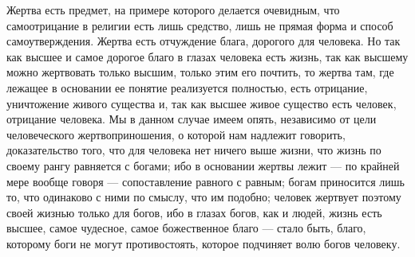 \documentclass[12pt]{article}
\begin{document}
Жертва есть предмет, на примере которого делается очевидным, что самоотрицание в религии есть лишь средство, лишь не прямая форма и способ самоутверждения. Жертва есть отчуждение блага, дорогого для человека. Но так как высшее и самое дорогое благо в глазах человека есть жизнь, так как высшему можно жертвовать только высшим, только этим его почтить, то жертва там, где лежащее в основании ее понятие реализуется полностью, есть отрицание, уничтожение живого существа и, так как высшее живое существо есть человек, отрицание человека. Мы в данном случае имеем опять, независимо от цели человеческого жертвоприношения, о которой нам надлежит говорить, доказательство того, что для человека нет ничего выше жизни, что жизнь по своему рангу равняется с богами; ибо в основании жертвы лежит --- по крайней мере вообще говоря --- сопоставление равного с равным; богам приносится лишь то, что одинаково с ними по смыслу, что им подобно; человек жертвует поэтому своей жизнью только для богов, ибо в глазах богов, как и людей, жизнь есть высшее, самое чудесное, самое божественное благо --- стало быть, благо, которому боги не могут противостоять, которое подчиняет волю богов человеку. 
\end{document}
